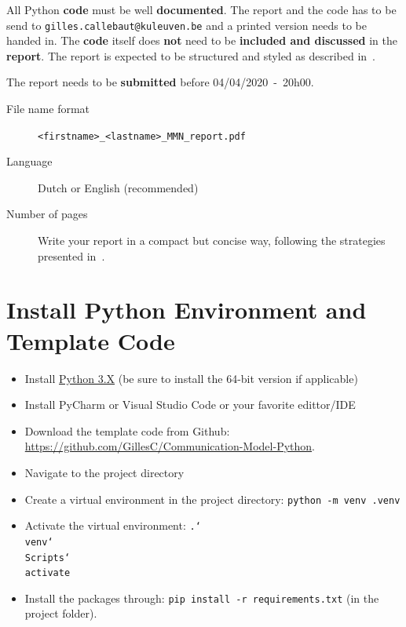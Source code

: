 \documentclass[12pt,a4paper]{article}
\newcommand{\softDeadline}{04/04/2020\ -\ 20h00}
\begin{document}
All Python \textbf{code} must be well \textbf{documented}.
The report and the code has to be send to \texttt{gilles.callebaut@kuleuven.be} and a printed version needs to be handed in. The \textbf{code} itself does \textbf{not} need to be \textbf{included and discussed} in the \textbf{report}. 
The report is expected to be structured and styled as described in~\cite{hoogenboom2012write,kallestinova2011write}.

The report needs to be \textbf{submitted} before \softDeadline.

\begin{description}
	\item[File name format]  \texttt{<firstname>\_<lastname>\_MMN\_report.pdf}
	\item[Language] Dutch or English (recommended)
	\item[Number of pages] Write your report in a compact but concise way, following the
	strategies presented in~\cite{hoogenboom2012write,kallestinova2011write}.
\end{description}

\cleardoublepage%
\appendix
\section{Install Python Environment and Template Code}
\begin{itemize}
	\item Install \href{https://www.python.org/downloads}{Python 3.X} (be sure to install the 64-bit version if applicable)
	\item Install PyCharm or Visual Studio Code or your favorite edittor/IDE
	\item Download the template code from Github: \url{https://github.com/GillesC/Communication-Model-Python}.
	\item Navigate to the project directory
	\item Create a virtual environment in the project directory: \texttt{python -m venv .venv}
	\item Activate the virtual environment:
	\texttt{.\char`\\venv\char`\\Scripts\char`\\activate}
	\item Install the packages through: \texttt{pip install -r requirements.txt} (in the project folder).
\end{itemize}






\end{document}
